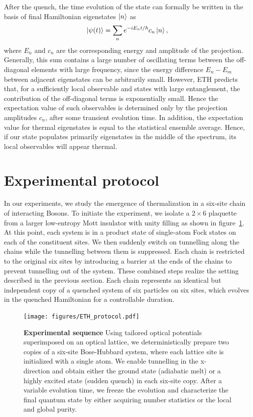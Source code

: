 After the quench, the time evolution of the state can formally be written in the basis of final Hamiltonian eigenstates $\left|n\right\rangle$ as
\begin{equation}
\left|\psi(t)\right\rangle=\sum_n e^{-iE_nt/\hbar}c_n\left|n\right\rangle,
\end{equation}
where $E_n$ and $c_n$ are the corresponding energy and amplitude of the projection. Generally, this sum contains a large number of oscillating terms between the off-diagonal elements with large frequency, since the energy difference $E_n-E_m$ between adjacent eigenstates can be arbitrarily small. However, ETH predicts that, for a sufficiently local observable and states with large entanglement, the contribution of the off-diagonal terms is exponentially small. Hence the expectation value of such observables is determined only by the projection amplitudes $c_n$, after some transient evolution time. In addition, the expectation value for thermal eigenstates is equal to the statistical ensemble average. Hence, if our state populates primarily eigenstates in the middle of the spectrum, its local observables will appear thermal.  

\section{Experimental protocol}
In our experiments, we study the emergence of thermalization in a six-site chain of interacting Bosons. To initiate the experiment, we isolate a $2 \times 6$ plaquette from a larger low-entropy Mott insulator with unity filling as shown in figure~\ref{fig:ETH_protocol}. At this point, each system is in a product state of single-atom Fock states on each of the constituent sites. We then suddenly switch on tunnelling along the chains while the tunnelling between them is suppressed. Each chain is restricted to the original six sites by introducing a barrier at the ends of the chains to prevent tunnelling out of the system. These combined steps realize the setting described in the previous section. Each chain represents an identical but independent copy of a quenched system of six particles on six sites, which evolves in the quenched Hamiltonian for a controllable duration.

\begin{figure}[t]
	\centering
	\texttt{[image: figures/ETH\_protocol.pdf]}
	\caption{{\bf Experimental sequence} Using tailored optical potentials superimposed on an optical lattice, we deterministically prepare two copies of a six-site Bose-Hubbard system, where each lattice site is initialized with a single atom. We enable tunnelling in the x-direction and obtain either the ground state (adiabatic melt) or a highly excited state (sudden quench) in each six-site copy. After a variable evolution time, we freeze the evolution and characterize the final quantum state by either acquiring number statistics or the local and global purity.}
	
	\label{fig:ETH_protocol}
\end{figure} 


